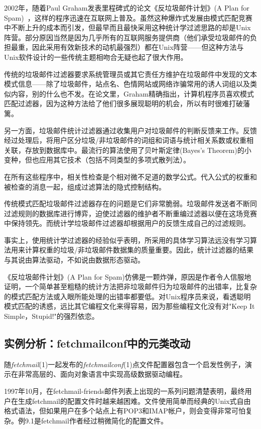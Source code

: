 \documentclass[12pt,oneside]{ctexbook}
\begin{document}
\begin{common-format}
2002年，随着Paul Graham发表里程碑式的论文《反垃圾邮件计划》(A Plan for Spam)~\cite{Graham}，这样的程序迅速在互联网上普及。虽然这种爆炸式发展由模式匹配竞赛中不断上升的成本而引发，但最早而且最快采用这种统计学过滤思路的却是Unix阵营。部分原因当然是因为几乎所有的互联网服务提供商（他们承受垃圾邮件的负担最重，因此采用有效新技术的动机最强烈）都在Unix阵营——但这种方法与Unix软件设计的一些传统主题相吻合无疑也起了很大作用。

传统的垃圾邮件过滤器要求系统管理员或其它责任方维护在垃圾邮件中发现的文本模式信息——除了垃圾邮件，站点名、色情网站或网络诈骗常用的诱人词组以及类似内容，别的什么也不发。在论文里，Graham精确指出，计算机程序员喜欢模式匹配过滤器，因为这种方法给了他们很多展现聪明的机会，所以有时很难打破藩篱。

另一方面，垃圾邮件统计过滤器通过收集用户对垃圾邮件的判断反馈来工作。反馈经过处理后，将用户区分垃圾/非垃圾邮件的词组和词语与统计相关系数或权重相关联，存放到数据库中。最流行的算法使用了贝叶斯定律(Bayes's Theorem)的小变种，但也应用其它技术（包括不同类型的多项式散列法）。

在所有这些程序中，相关性检查是个相对微不足道的数学公式。代入公式的权重和被检查的消息一起，组成过滤算法的隐式控制结构。

传统模式匹配垃圾邮件过滤器存在的问题是它们非常脆弱。垃圾邮件发送者不断同过滤规则的数据库进行博弈，迫使过滤器的维护者不断重编过滤器以便在这场竞赛中保持领先。而统计学垃圾邮件过滤器却根据用户的反馈生成自己的过滤规则。

事实上，使用统计学过滤器的经验似乎表明，所采用的具体学习算法远没有学习算法用来计算权重的垃圾/非垃圾邮件数据集的质量重要。因此，统计过滤器的结果与其说由算法驱动，不如说由数据形态驱动。

《反垃圾邮件计划》(A Plan for Spam)仿佛是一颗炸弹，原因是作者令人信服地证明，一个简单甚至粗糙的统计方法把非垃圾邮件归为垃圾邮件的出错率，比复杂的模式匹配方法或入眼所能处理的出错率都要低。对Unix程序员来说，看透聪明模式匹配的诱惑，远比其它编程文化来得容易，因为那些编程文化没有对"Keep It Simple，Stupid!"的强烈依恋。

\subsection{实例分析：fetchmailconf中的元类改动}
随\textit{fetchmail}(1)一起发布的\textit{fetchmailconf}(1)点文件配置器包含一个启发性例子，演示在非常高层的、面向对象语言中实现高级数据驱动编程。

1997年10月，在fetchmail-friends邮件列表上出现的一系列问题清楚表明，最终用户在生成fetchmail的配置文件时越来越困难。文件使用简单而经典的Unix式自由格式语法，但如果用户在多个站点上有POP3和IMAP帐户，则会变得非常可怕复杂。例9.1是fetchmail作者经过稍微简化的配置文件。




\end{common-format}
\end{document}
